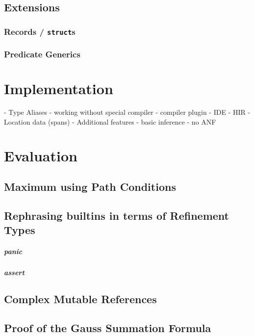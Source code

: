 \documentclass{book}
\newcommand{\code}[1]{\texttt{#1}}
\theoremstyle{definition}
\begin{document}
\section{Extensions}

\subsection{Records / \code{struct}s}
\subsection{Predicate Generics}

\chapter{Implementation}


- Type Aliases
- working without special compiler
- compiler plugin
- IDE
- HIR
- Location data (spans)
- Additional features
  - basic inference
  - no ANF

\chapter{Evaluation}

\section{Maximum using Path Conditions}



\section{Rephrasing builtins in terms of Refinement Types}

\paragraph*{panic}
\paragraph*{assert}

\label{subsec:evaluation-complex-mutable-ref}\section{Complex Mutable References}

\section{Proof of the Gauss Summation Formula}
\end{document}
